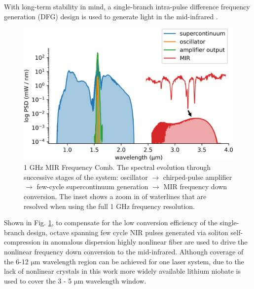 \documentclass{optica-article}
\begin{document}
With long-term stability in mind, a single-branch intra-pulse difference frequency generation (DFG) design is used to generate light in the mid-infrared \cite{hoghooghiBroadband1GHzMidinfrared2022}. 
% 
\begin{figure}[h]
    \centering
    \includegraphics[width=\linewidth]{spectrum_in_setup.png}
    \caption{1 GHz MIR Frequency Comb. The spectral evolution through successive stages of the system: oscillator $\rightarrow$ chirped-pulse amplifier $\rightarrow$ few-cycle supercontinuum generation $\rightarrow$ MIR frequency down conversion. The inset shows a zoom in of waterlines that are resolved when using the full 1 GHz frequency resolution.}
    \label{fig:spectrum_in_setup}
\end{figure}
%
Shown in Fig. \ref{fig:spectrum_in_setup}, to compensate for the low conversion efficiency of the single-branch design, octave spanning few cycle NIR pulses generated via soliton self-compression in anomalous dispersion highly nonlinear fiber are used to drive the nonlinear frequency down conversion to the mid-infrared. Although coverage of the 6-12 $\mathrm{\mu m}$ wavelength region can be achieved for one laser system, due to the lack of nonlinear crystals in this work more widely available lithium niobate is used to cover the 3 - 5 $\mathrm{\mu m}$ wavelength window.
\end{document}
